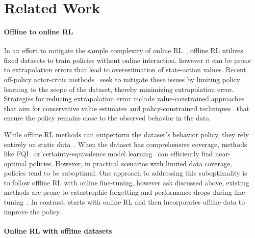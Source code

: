 \section{Related Work}
\label{sec:related}

\paragraph{Offline to online RL}%








In an effort to mitigate the sample complexity of online RL~\citep{liu2023active},
offline RL utilizes fixed datasets to train policies without online interaction, however it can be prone to extrapolation errors that lead to overestimation of state-action values.
Recent off-policy actor-critic methods~\citep{fujimoto2019off, kostrikov2021offline, kumar2020conservative, wang2020critic} seek to mitigate these issues by limiting policy learning to the scope of the dataset, thereby minimizing extrapolation error. 
Strategies for reducing extrapolation error include value-constrained approaches~\citep{kumar2020conservative} that aim for conservative value estimates and policy-constrained techniques~\citep{nair2020awac} that ensure the policy remains close to the observed behavior in the data.

While offline RL methods can outperform the dataset’s behavior policy, they rely entirely on static data~\citep{levine2020offline}. When the dataset has comprehensive coverage, methods like FQI~\citep{antos2007fitted} or certainty-equivalence model learning~\citep{rathnam2023unintended} can efficiently find near-optimal policies. %
However, in practical scenarios with limited data coverage, policies tend to be suboptimal. 
One approach to addressing this suboptimality is to follow offline RL with online fine-tuning, however ask discussed above, existing methods are prone to catastrophic forgetting and performance drops during fine-tuning~\citep{luo2023finetuning}. In contrast, \algname starts with online RL and then incorporates offline data to improve the policy.


\paragraph{Online RL with offline datasets}
\vspace{-0.3cm}


